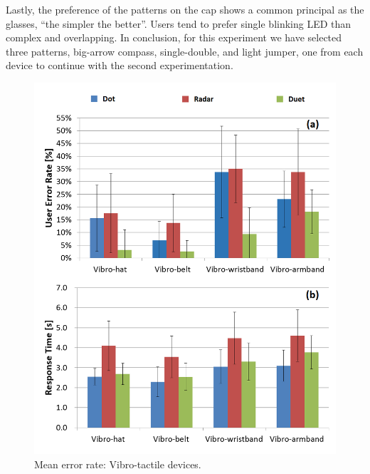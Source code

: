 \documentclass{sigchi}
\begin{document}
Lastly, the preference of the patterns on the cap shows a common principal as the glasses, \textquotedblleft the simpler the better\textquotedblright. Users tend to prefer single blinking LED than complex and overlapping. In conclusion, for this experiment we have selected three patterns, big-arrow compass, single-double, and light jumper, one from each device to continue with the second experimentation.

\begin{figure}[!t]
\centering
\includegraphics[width=\columnwidth]{stage1_Vibro_ER&RT}
\caption{Mean error rate: Vibro-tactile devices.}
\label{fig:vibro_ER&RT}
\end{figure}

\end{document}
